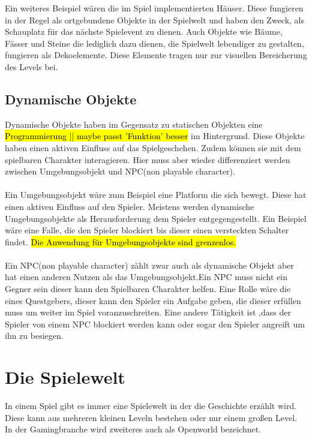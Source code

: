 Ein weiteres Beispiel wären die im Spiel implementierten Häuser. Diese fungieren in der Regel als ortgebundene Objekte in der Spielwelt und haben den Zweck, als Schauplatz für das nächste Spielevent zu dienen. Auch Objekte wie Bäume, Fässer und Steine die lediglich dazu dienen, die Spielwelt lebendiger zu gestalten, fungieren als Dekoelemente. Diese Elemente tragen nur zur visuellen Bereicherung des Levels bei.


\subsection{Dynamische Objekte}
Dynamische Objekte haben im Gegensatz zu statischen Objekten eine \hl{Programmierung || maybe passt 'Funktion' besser} im Hintergrund. Diese Objekte haben einen aktiven Einfluss auf das Spielgeschehen. Zudem können sie mit dem spielbaren Charakter interagieren. Hier muss aber wieder differenziert werden zwischen Umgebungsobjekt und NPC(non playable character).\\\\ %
Ein Umgebungsobjekt wäre zum Beispiel eine Platform die sich bewegt. Diese hat einen aktiven Einfluss auf den Spieler. Meistens werden dynamische Umgebungsobjekte als Herausforderung dem Spieler entgegengestellt. Ein Beispiel wäre eine Falle, die den Spieler blockiert bis dieser einen versteckten Schalter findet. \hl{
    Die Anwendung für Umgebungsobjekte sind grenzenlos. %
}\\\\
Ein NPC(non playable character) zählt zwar auch als dynamische Objekt aber hat einen anderen Nutzen als das Umgebungsobjekt.Ein NPC muss nicht ein Gegner sein dieser kann den Spielbaren Charakter helfen. Eine Rolle wäre die eines Questgebers, dieser kann den Spieler ein Aufgabe geben, die dieser erfüllen muss um weiter im Spiel voranzuschreiten. Eine andere Tätigkeit ist ,dass der Spieler von einem NPC blockiert werden kann oder sogar den Spieler angreift um ihn zu besiegen.

\pagebreak

\section{Die Spielewelt}
In einem Spiel gibt es immer eine Spielewelt in der die Geschichte erzählt wird. Diese kann aus mehreren kleinen Leveln bestehen oder nur einem großen Level. In der Gamingbranche wird zweiteres auch als Openworld bezeichnet.


